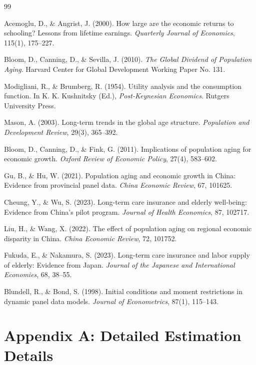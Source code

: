 \documentclass[12pt]{article}
\begin{document}
\begin{thebibliography}{99}

 Acemoglu, D., \& Angrist, J. (2000). How large are the economic returns to schooling? Lessons from lifetime earnings. \textit{Quarterly Journal of Economics}, 115(1), 175--227.

 Bloom, D., Canning, D., \& Sevilla, J. (2010). \textit{The Global Dividend of Population Aging}. Harvard Center for Global Development Working Paper No. 131.

 Modigliani, R., \& Brumberg, R. (1954). Utility analysis and the consumption function. In K. K. Kushnitsky (Ed.), \textit{Post-Keynesian Economics}. Rutgers University Press.

 Mason, A. (2003). Long-term trends in the global age structure. \textit{Population and Development Review}, 29(3), 365--392.

 Bloom, D., Canning, D., \& Fink, G. (2011). Implications of population aging for economic growth. \textit{Oxford Review of Economic Policy}, 27(4), 583--602.

 Gu, B., \& Hu, W. (2021). Population aging and economic growth in China: Evidence from provincial panel data. \textit{China Economic Review}, 67, 101625.

 Cheung, Y., \& Wu, S. (2023). Long-term care insurance and elderly well-being: Evidence from China's pilot program. \textit{Journal of Health Economics}, 87, 102717.

 Liu, H., \& Wang, X. (2022). The effect of population aging on regional economic disparity in China. \textit{China Economic Review}, 72, 101752.

 Fukuda, E., \& Nakamura, S. (2023). Long-term care insurance and labor supply of elderly: Evidence from Japan. \textit{Journal of the Japanese and International Economies}, 68, 38--55.

 Blundell, R., \& Bond, S. (1998). Initial conditions and moment restrictions in dynamic panel data models. \textit{Journal of Econometrics}, 87(1), 115--143.

\end{thebibliography}

\appendix
\section{Appendix A: Detailed Estimation Details}
\end{document}
